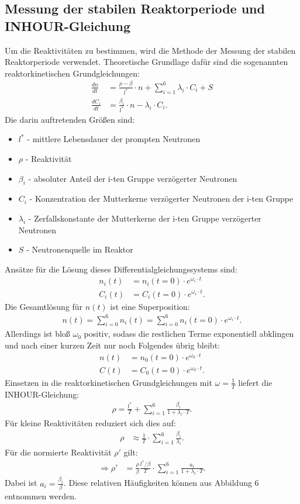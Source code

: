 \documentclass[german,  %
parskip=full,  %
]{scrartcl}
\begin{document}
\subsection{Messung der stabilen Reaktorperiode und INHOUR-Gleichung}
Um die Reaktivitäten zu bestimmen, wird die Methode der Messung der stabilen Reaktorperiode verwendet. Theoretische Grundlage dafür sind die sogenannten reaktorkinetischen Grundgleichungen:
\begin{align}
\frac{dn}{dt} &= \frac{\rho - \beta}{l^*} \cdot n + \sum_{i=1}^{6}\lambda_i \cdot C_i + S \\
\frac{dC_i}{dt} &= \frac{\beta_i}{l^*} \cdot n - \lambda_i \cdot C_i.
\end{align}
Die darin auftretenden Größen sind:
\begin{itemize}
\item $l^*$ - mittlere Lebensdauer der prompten Neutronen
\item $\rho$ - Reaktivität
\item $\beta_i$ - absoluter Anteil der i-ten Gruppe verzögerter Neutronen
\item $C_i$ - Konzentration der Mutterkerne verzögerter Neutronen der i-ten Gruppe
\item $\lambda_i$ - Zerfallskonstante der Mutterkerne der i-ten Gruppe verzögerter Neutronen
\item $S$ - Neutronenquelle im Reaktor
\end{itemize}
Ansätze für die Lösung dieses Differentialgleichungssystems sind:
\begin{align}
n_i(t) &= n_i(t=0) \cdot e^{\omega_i \cdot t} \\
C_i(t) &= C_i(t=0) \cdot e^{\omega_i \cdot t}.
\end{align}
Die Gesamtlösung für $n(t)$ ist eine Superposition:
\begin{align}
n(t) = \sum_{i = 0}^{6} n_i(t) = \sum_{i = 0}^{6}  n_i(t=0) \cdot e^{\omega_i \cdot t}.
\end{align}
Allerdings ist bloß $\omega_{0}$ positiv, sodass die restlichen Terme exponentiell abklingen und nach einer kurzen Zeit nur noch Folgendes übrig bleibt:
\begin{align}
n(t) &= n_0(t=0) \cdot e^{\omega_0 \cdot t} \\
C(t) &= C_0(t=0) \cdot e^{\omega_0 \cdot t}.
\end{align}
Einsetzen in die reaktorkinetischen Grundgleichungen mit $\omega = \frac{1}{T}$ liefert die INHOUR-Gleichung:
\begin{align}
\rho = \frac{l^*}{T} + \sum_{i=1}^{6} \frac{\beta_i}{1+ \lambda_i \cdot T}.
\end{align}
Für kleine Reaktivitäten reduziert sich dies auf:
\begin{align}
\rho &\approx \frac{1}{T} \cdot \sum_{i=1}^{6} \frac{\beta_i}{\lambda_i}.
\end{align}
Für die normierte Reaktivität $\rho'$ gilt:
\begin{align}
\Rightarrow \rho' & = \frac{\rho}{\beta} \frac{l^* / \beta}{T} \cdot \sum_{i=1}^{6} \frac{a_i}{1+ \lambda_i \cdot T}.
\end{align}
Dabei ist $a_i = \frac{\beta_i}{\beta}$. Diese relativen Häufigkeiten können aus Abbildung 6 entnommen werden.
\end{document}
